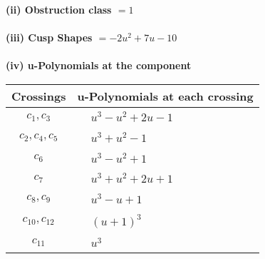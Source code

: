 \documentclass[1p]{elsarticle_modified}
\theoremstyle{definition}
\begin{document}
\flushleft \textbf{(ii) Obstruction class $= 1$}\\~\\
\flushleft \textbf{(iii) Cusp Shapes $= -2 u^2+7 u-10$}\\~\\
\newpage\renewcommand{\arraystretch}{1}
\flushleft \textbf{(iv) u-Polynomials at the component}\newline \\
\begin{tabular}{m{50pt}|m{274pt}}
Crossings & \hspace{64pt}u-Polynomials at each crossing \\
\hline $$\begin{aligned}c_{1},c_{3}\end{aligned}$$&$\begin{aligned}
&u^3- u^2+2 u-1
\end{aligned}$\\
\hline $$\begin{aligned}c_{2},c_{4},c_{5}\end{aligned}$$&$\begin{aligned}
&u^3+u^2-1
\end{aligned}$\\
\hline $$\begin{aligned}c_{6}\end{aligned}$$&$\begin{aligned}
&u^3- u^2+1
\end{aligned}$\\
\hline $$\begin{aligned}c_{7}\end{aligned}$$&$\begin{aligned}
&u^3+u^2+2 u+1
\end{aligned}$\\
\hline $$\begin{aligned}c_{8},c_{9}\end{aligned}$$&$\begin{aligned}
&u^3- u+1
\end{aligned}$\\
\hline $$\begin{aligned}c_{10},c_{12}\end{aligned}$$&$\begin{aligned}
&(u+1)^3
\end{aligned}$\\
\hline $$\begin{aligned}c_{11}\end{aligned}$$&$\begin{aligned}
&u^3
\end{aligned}$\\
\hline
\end{tabular}\\~\\
\end{document}
